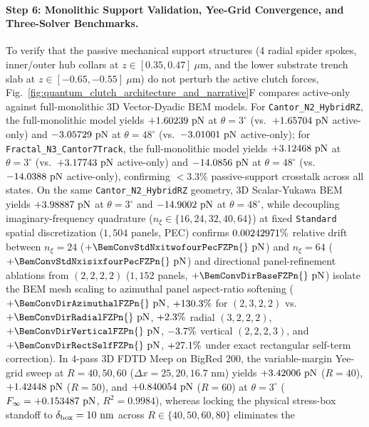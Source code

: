 \documentclass[11pt,letterpaper]{article}
\begin{document}
\paragraph{Step 6: Monolithic Support Validation, Yee-Grid Convergence, and Three-Solver Benchmarks.}
To verify that the passive mechanical support structures (4 radial spider spokes, inner/outer hub collars at $z \in [0.35, 0.47]\ \mu\text{m}$, and the lower substrate trench slab at $z \in [-0.65, -0.55]\ \mu\text{m}$) do not perturb the active clutch forces, Fig.~\ref{fig:quantum_clutch_architecture_and_narrative}F compares active-only against full-monolithic 3D Vector-Dyadic BEM models. For \texttt{Cantor\_N2\_HybridRZ}, the full-monolithic model yields $+1.60239{}\text{ pN}$ at $\theta=3^\circ$ (vs.\ $+1.65704{}\text{ pN}$ active-only) and $-3.05729{}\text{ pN}$ at $\theta=48^\circ$ (vs.\ $-3.01001{}\text{ pN}$ active-only); for \texttt{Fractal\_N3\_Cantor7Track}, the full-monolithic model yields $+3.12468{}\text{ pN}$ at $\theta=3^\circ$ (vs.\ $+3.17743{}\text{ pN}$ active-only) and $-14.0856{}\text{ pN}$ at $\theta=48^\circ$ (vs.\ $-14.0388{}\text{ pN}$ active-only), confirming $<3.3\%$ passive-support crosstalk across all states. On the same \texttt{Cantor\_N2\_HybridRZ} geometry, 3D Scalar-Yukawa BEM yields $+3.98887{}\text{ pN}$ at $\theta=3^\circ$ and $-14.9002{}\text{ pN}$ at $\theta=48^\circ$, while decoupling imaginary-frequency quadrature ($n_\xi \in \{16, 24, 32, 40, 64\}$) at fixed \texttt{Standard} spatial discretization ($1{,}504$ panels, PEC) confirms $0.00242971{}\%$ relative drift between $n_\xi = 24$ ($+\BemConvStdNxitwofourPecFZPn{}\text{ pN}$) and $n_\xi = 64$ ($+\BemConvStdNxisixfourPecFZPn{}\text{ pN}$) and directional panel-refinement ablations from $(2,2,2,2)$ ($1{,}152$ panels, $+\BemConvDirBaseFZPn{}\text{ pN}$) isolate the BEM mesh scaling to azimuthal panel aspect-ratio softening ($+\BemConvDirAzimuthalFZPn{}\text{ pN}$, $+130.3{}\%$ for $(2,3,2,2)$ vs.\ $+\BemConvDirRadialFZPn{}\text{ pN}$, $+2.3{}\%$ radial $(3,2,2,2)$, $+\BemConvDirVerticalFZPn{}\text{ pN}$, $-3.7{}\%$ vertical $(2,2,2,3)$, and $+\BemConvDirRectSelfFZPn{}\text{ pN}$, $+27.1{}\%$ under exact rectangular self-term correction). In 4-pass 3D FDTD Meep on BigRed 200, the variable-margin Yee-grid sweep at $R=40, 50, 60$ ($\Delta x = 25, 20, 16.7\text{ nm}$) yields $+3.42006{}\text{ pN}$ ($R=40$), $+1.42448{}\text{ pN}$ ($R=50$), and $+0.840054{}\text{ pN}$ ($R=60$) at $\theta=3^\circ$ ($F_\infty = +0.153487{}\text{ pN}$, $R^2 = 0.9984$), whereas locking the physical stress-box standoff to $\delta_{\rm box} = 10{}\text{ nm}$ across $R \in \{40, 50, 60, 80\}$ eliminates the 
\end{document}
